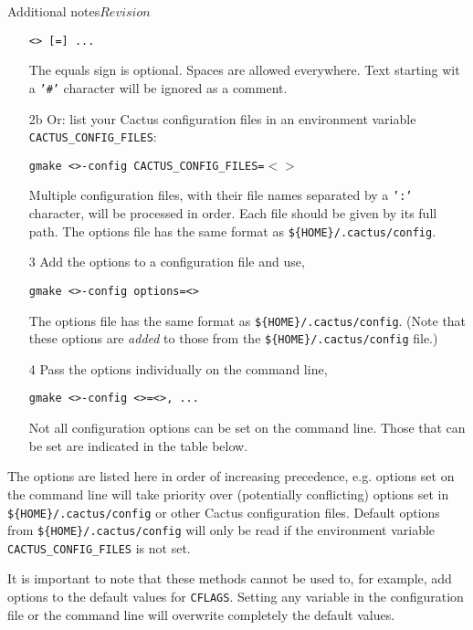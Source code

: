 \begin{cactuspart}{Additional notes}{}{$Revision$}
\begin{enumerate}
    \texttt{<> [=] ...}

    The equals sign is optional. Spaces are allowed everywhere.
    Text starting wit a \texttt{'\#'} character will be ignored as a comment.

  \item[2b]{}
    Or: list your Cactus configuration files in an environment variable
    \texttt{CACTUS\_CONFIG\_FILES}:

    \texttt{gmake <>-config
                  CACTUS\_CONFIG\_FILES=$<$$>$}

    Multiple configuration files, with their file names separated by a
    \texttt{':'} character, will be processed in order.
    Each file should be given by its full path.
    The options file has the same format as \texttt{\$\{HOME\}/.cactus/config}.

  \item[3]{}
    Add the options to a configuration file and use,

    \texttt{gmake <>-config  options=<>}

    The options file has the same format as \texttt{\$\{HOME\}/.cactus/config}.
    (Note that these options are \emph{added} to those from the
    \texttt{\$\{HOME\}/.cactus/config} file.)

  \item[4]{}
    Pass the options individually on the command line,

    \texttt{gmake <>-config
                           <>=<>, ...}

    Not all configuration options can be set on the command line.
    Those that can be set are indicated in the table below.
\end{enumerate}

The options are listed here in order of increasing precedence, e.g. options
set on the command line will take priority over (potentially
conflicting) options set in \texttt{\$\{HOME\}/.cactus/config} or other
Cactus configuration files. Default options from
\texttt{\$\{HOME\}/.cactus/config} will only be read if the
environment variable \texttt{CACTUS\_CONFIG\_FILES} is not set.

It is important to note that these methods cannot be used to, for example, add
options to the default values for \texttt{CFLAGS}.  Setting any variable in the
configuration file or the command line will overwrite completely the
default values.


\end{cactuspart}
